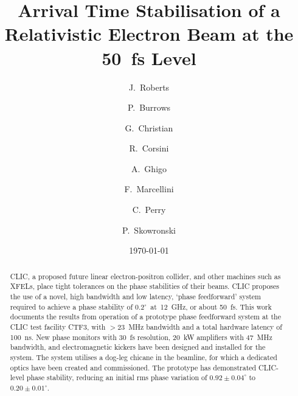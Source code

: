 \documentclass[%
 reprint,
superscriptaddress,
 amsmath,amssymb,
 prl,
]{revtex4-1}
\begin{document}

\title{Arrival Time Stabilisation of a Relativistic Electron Beam at 
the 50~fs Level}

\author{J.~Roberts}

\author{P.~Burrows}

\author{G.~Christian}

\author{R.~Corsini}

\author{A.~Ghigo}

\author{F.~Marcellini}

\author{C.~Perry}

\author{P.~Skowronski}

\date{\today}

\begin{abstract}
CLIC, a proposed future linear electron-positron collider, and other machines 
such as XFELs, place tight tolerances on the phase stabilities of their beams. 
CLIC proposes the use of a novel, high bandwidth and low latency, `phase 
feedforward' system required to achieve a phase stability of 
\(0.2^\circ\)~at~12~GHz, or about 50~fs. This work documents the results from 
operation of a prototype phase feedforward system at the CLIC test facility 
CTF3, with \(>23\)~MHz bandwidth and a total hardware latency of 100~ns. New 
phase monitors with 30~fs resolution, 20~kW amplifiers with 47~MHz bandwidth, 
and electromagnetic kickers have been designed and installed for the system. 
The system utilises a dog-leg chicane in the beamline, for which a dedicated 
optics have been created and commissioned. The prototype has demonstrated 
CLIC-level phase stability, reducing an initial rms phase variation of 
\(0.92\pm0.04^\circ\) to \(0.20\pm0.01^\circ\).
\end{abstract}

\maketitle
\end{document}
